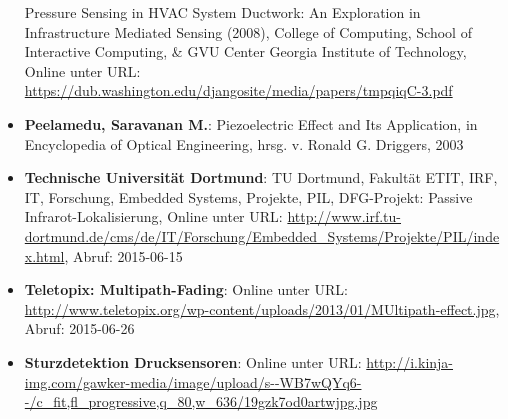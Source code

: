 \begin{itemize}[leftmargin=*]
Pressure Sensing in HVAC System Ductwork: An Exploration in Infrastructure Mediated Sensing (2008), College of Computing, School of Interactive Computing, \& GVU Center Georgia Institute of Technology, Online unter URL: 
\url{https://dub.washington.edu/djangosite/media/papers/tmpqiqC-3.pdf}
\item[] \textbf{Peelamedu, Saravanan M.}: Piezoelectric Effect and Its Application, in Encyclopedia of Optical Engineering, hrsg. v. Ronald G. Driggers, 2003
\item[] \textbf{Technische Universität Dortmund}: TU Dortmund, Fakultät ETIT, IRF, IT, Forschung, Embedded Systems,  Projekte, PIL, DFG-Projekt: Passive Infrarot-Lokalisierung, Online unter URL: \url{http://www.irf.tu-dortmund.de/cms/de/IT/Forschung/Embedded_Systems/Projekte/PIL/index.html}, Abruf: 2015-06-15
\item[] \textbf{Teletopix: Multipath-Fading}: Online unter URL: \url{http://www.teletopix.org/wp-content/uploads/2013/01/MUltipath-effect.jpg}, Abruf: 2015-06-26
\item[] \textbf{Sturzdetektion Drucksensoren}: Online unter URL: \url{http://i.kinja-img.com/gawker-media/image/upload/s--WB7wQYq6--/c_fit,fl_progressive,q_80,w_636/19gzk7od0artwjpg.jpg}
\end{itemize}
